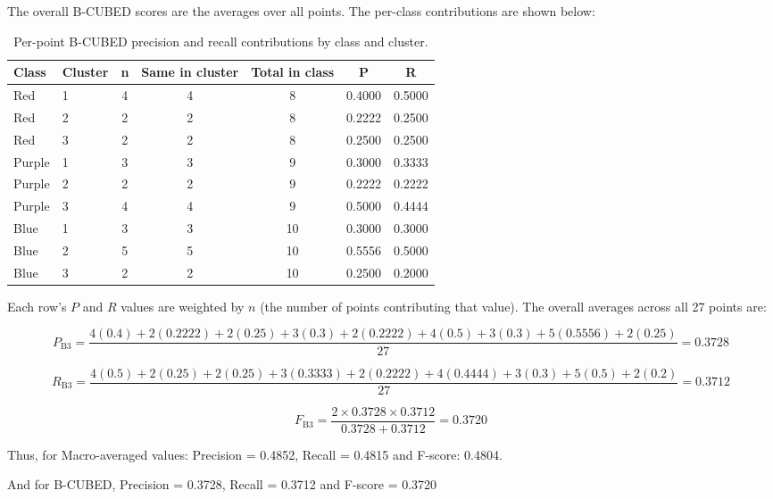 \documentclass[11pt]{article}
\begin{document}
The overall B-CUBED scores are the averages over all points. The per-class contributions are shown below:

\begin{table}[H]
\centering
\begin{tabular}{llccccc}
\toprule
\textbf{Class} & \textbf{Cluster} & \textbf{n} & \textbf{Same in cluster} & \textbf{Total in class} & \textbf{P} & \textbf{R} \\
\midrule
Red    & 1 & 4 & 4 & 8  & 0.4000 & 0.5000 \\
Red    & 2 & 2 & 2 & 8  & 0.2222 & 0.2500 \\
Red    & 3 & 2 & 2 & 8  & 0.2500 & 0.2500 \\
Purple & 1 & 3 & 3 & 9  & 0.3000 & 0.3333 \\
Purple & 2 & 2 & 2 & 9  & 0.2222 & 0.2222 \\
Purple & 3 & 4 & 4 & 9  & 0.5000 & 0.4444 \\
Blue   & 1 & 3 & 3 & 10 & 0.3000 & 0.3000 \\
Blue   & 2 & 5 & 5 & 10 & 0.5556 & 0.5000 \\
Blue   & 3 & 2 & 2 & 10 & 0.2500 & 0.2000 \\
\bottomrule
\end{tabular}
\caption{Per-point B-CUBED precision and recall contributions by class and cluster.}
\label{tab:bcubed}
\end{table}

Each row's $P$ and $R$ values are weighted by $n$ (the number of points contributing that value). The overall averages across all 27 points are:

\[
P_{\text{B3}} = \frac{4(0.4) + 2(0.2222) + 2(0.25) + 3(0.3) + 2(0.2222) + 4(0.5) + 3(0.3) + 5(0.5556) + 2(0.25)}{27} = 0.3728
\]

\[
R_{\text{B3}} = \frac{4(0.5) + 2(0.25) + 2(0.25) + 3(0.3333) + 2(0.2222) + 4(0.4444) + 3(0.3) + 5(0.5) + 2(0.2)}{27} = 0.3712
\]

\[
F_{\text{B3}} = \frac{2 \times 0.3728 \times 0.3712}{0.3728 + 0.3712} = 0.3720
\]

\bigskip

Thus, for Macro-averaged values: Precision = 0.4852, Recall = 0.4815 and F-score: 0.4804. 

\bigskip

And for B-CUBED, Precision = 0.3728, Recall = 0.3712 and F-score = 0.3720
\end{document}
